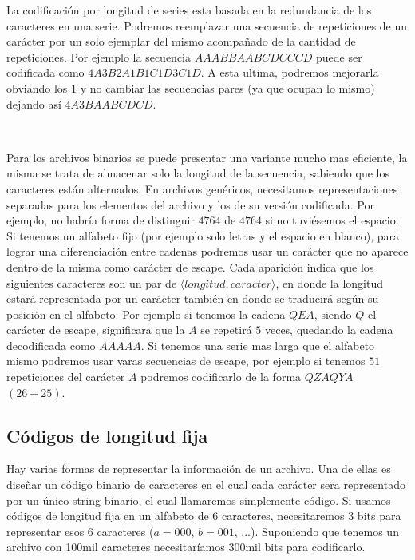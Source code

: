 \documentclass[10pt, a4paper]{report}
\begin{document}
La codificaci\'on por longitud de series esta basada en la redundancia de los caracteres en una serie. Podremos reemplazar una secuencia de repeticiones de un car\'acter por un solo ejemplar del mismo acompa\~nado de la cantidad de repeticiones. Por ejemplo la secuencia $AAABBAABCDCCCD$ puede ser codificada como $4A3B2A1B1C1D3C1D$. A esta ultima, podremos mejorarla obviando los $1$ y no cambiar las secuencias pares (ya que ocupan lo mismo) dejando as\'i $4A3BAABCDCD$.

~

Para los archivos binarios se puede presentar una variante mucho mas eficiente, la misma se trata de almacenar solo la longitud de la secuencia, sabiendo que los caracteres est\'an alternados. En archivos gen\'ericos, necesitamos representaciones separadas para los elementos del archivo y los de su versi\'on codificada. Por ejemplo, no habr\'ia forma de distinguir $47 64$ de $4 764$ si no tuvi\'esemos el espacio. Si tenemos un alfabeto fijo (por ejemplo solo letras y el espacio en blanco), para lograr una diferenciaci\'on entre cadenas podremos usar un car\'acter que no aparece dentro de la misma como car\'acter de escape. Cada aparici\'on indica que los siguientes caracteres son un par de $\langle longitud, caracter \rangle$, en donde la longitud estar\'a representada por un car\'acter tambi\'en en donde se traducir\'a seg\'un su posici\'on en el alfabeto. Por ejemplo si tenemos la cadena $QEA$, siendo $Q$ el car\'acter de escape, significara que la $A$ se repetir\'a $5$ veces, quedando la cadena 
decodificada como $AAAAA$. Si tenemos una serie mas larga que el alfabeto mismo podremos usar varas secuencias de escape, por ejemplo si tenemos $51$ repeticiones del car\'acter $A$ podremos codificarlo de la forma $QZAQYA$ $(26+25)$.

\subsection{C\'odigos de longitud fija}

Hay varias formas de representar la informaci\'on de un archivo. Una de ellas es dise\~nar un c\'odigo binario de caracteres en el cual cada car\'acter sera representado por un \'unico string binario, el cual llamaremos simplemente c\'odigo. Si usamos c\'odigos de longitud fija en un alfabeto de $6$ caracteres, necesitaremos $3$ bits para representar esos $6$ caracteres ($a=000$, $b=001$, ...). Suponiendo que tenemos un archivo con 100mil caracteres necesitar\'iamos 300mil bits para codificarlo.
\end{document}
